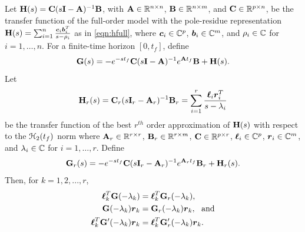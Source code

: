 \documentclass[twocolumn]{autart}
\begin{document}
\begin{theorem}\label{mh2opt}
Let $\mathbf{H}(s)= \mathbf{C}(s\mathbf{I}-\mathbf{A})^{-1} \mathbf{B}$, with $\mathbf{A} \in \mathbb{R}^{n \times n}$, $\mathbf{B} \in \mathbb{R}^{n \times m}$, and $\mathbf{C} \in \mathbb{R}^{p \times n}$,   be the transfer function of the full-order model with  the pole-residue representation 
$
\mathbf{H}(s) =  \sum_{i=1}^n \frac{\boldsymbol{c}_i \boldsymbol{b}_i^T}{s-\rho_i}
$
as in \eqref{eqn:hfull}, where $\boldsymbol{c}_i \in \mathbb{C}^{p}$, $\boldsymbol{b}_i \in \mathbb{C}^m$, and $\rho_i \in \mathbb{C}$ for $i=1,\ldots,n$. 
For a finite-time horizon $[0,t_f]$, define 
\begin{equation} \label{eqn:defG}
\mathbf{G}(s)=-e^{-st_f}\mathbf{C}(s\mathbf{I}-\mathbf{A})^{-1}e^{\mathbf{A} t_f}\mathbf{B}+\mathbf{H}(s).
\end{equation}
Let 
\begin{equation}
\mathbf{H}_r(s)= \mathbf{C}_r(s\mathbf{I}_r-\mathbf{A}_r)^{-1} \mathbf{B}_r = \sum_{i=1}^r \frac{\boldsymbol{\ell}_i \boldsymbol{r}_i^T}{s-\lambda_i} 
\end{equation}
be the transfer function of  the best $r^{th}$ order approximation of $\mathbf{H}(s)$ with respect to the $\EuScript{H}_2(t_f)$ norm
where $\mathbf{A}_r \in \mathbb{R}^{r \times r}$, $\mathbf{B}_r \in \mathbb{R}^{r \times m}$, $\mathbf{C} \in \mathbb{R}^{p \times r}$,  $\boldsymbol{\ell}_i \in \mathbb{C}^{p}$, $\boldsymbol{r}_i \in \mathbb{C}^m$, and $\lambda_i \in \mathbb{C}$ for $i=1,\ldots,r$.
Define 
\begin{equation} \label{eqn:defGr}
\mathbf{G}_{r}(s)=-e^{-st_f}\mathbf{C}(s\mathbf{I}_r-\mathbf{A}_r)^{-1}e^{\mathbf{A}_r t_f}\mathbf{B}_r+\mathbf{H}_r(s).
 \end{equation}
 Then,  for $k=1, 2, ... , r$,
\begin{align}
\boldsymbol{\ell}_k^T\mathbf{G}(-\lambda_k)&=\boldsymbol{\ell}_k^T\mathbf{G}_r(-\lambda_k),  \label{eqn:cond1} \\
\mathbf{G}(-\lambda_k)\boldsymbol{r}_k&=\mathbf{G}_r(-\lambda_k)\boldsymbol{r}_k,~~\mbox{and}  \label{eqn:cond2} \\
\boldsymbol{\ell}_k^T\mathbf{G}'(-\lambda_k)\boldsymbol{r}_k&=\boldsymbol{\ell}_k^T\mathbf{G}_r'(-\lambda_k)\boldsymbol{r}_k. \label{eqn:cond3}
\end{align}
\end{theorem}
\end{document}
